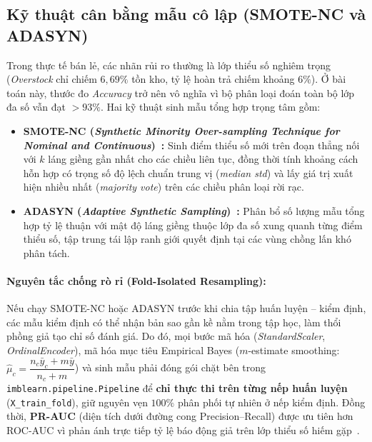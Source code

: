 \subsection{Kỹ thuật cân bằng mẫu cô lập (SMOTE-NC và ADASYN)}
Trong thực tế bán lẻ, các nhãn rủi ro thường là lớp thiểu số nghiêm trọng (\textit{Overstock} chỉ chiếm $6{,}69\%$ tồn kho, tỷ lệ hoàn trả chiếm khoảng $6\%$). Ở bài toán này, thước đo \textit{Accuracy} trở nên vô nghĩa vì bộ phân loại đoán toàn bộ lớp đa số vẫn đạt $> 93\%$. Hai kỹ thuật sinh mẫu tổng hợp trọng tâm gồm:
\begin{itemize}[topsep=0pt, itemsep=1pt]
	\item \textbf{SMOTE-NC (\textit{Synthetic Minority Over-sampling Technique for Nominal and Continuous})~\cite{chawla2002smote}:} Sinh điểm thiểu số mới trên đoạn thẳng nối với $k$ láng giềng gần nhất cho các chiều liên tục, đồng thời tính khoảng cách hỗn hợp có trọng số độ lệch chuẩn trung vị (\textit{median std}) và lấy giá trị xuất hiện nhiều nhất (\textit{majority vote}) trên các chiều phân loại rời rạc.
	\item \textbf{ADASYN (\textit{Adaptive Synthetic Sampling})~\cite{he2008adasyn}:} Phân bổ số lượng mẫu tổng hợp tỷ lệ thuận với mật độ láng giềng thuộc lớp đa số xung quanh từng điểm thiểu số, tập trung tái lập ranh giới quyết định tại các vùng chồng lấn khó phân tách.
\end{itemize}

\paragraph{Nguyên tắc chống rò rỉ (Fold-Isolated Resampling):} Nếu chạy SMOTE-NC hoặc ADASYN trước khi chia tập huấn luyện -- kiểm định, các mẫu kiểm định có thể nhận bản sao gần kề nằm trong tập học, làm thổi phồng giả tạo chỉ số đánh giá. Do đó, mọi bước mã hóa (\textit{StandardScaler}, \textit{OrdinalEncoder}), mã hóa mục tiêu Empirical Bayes ($m$-estimate smoothing: $\hat{\mu}_c = \dfrac{n_c \bar{y}_c + m \bar{y}}{n_c + m}$) và sinh mẫu phải đóng gói chặt bên trong \texttt{imblearn.pipeline.Pipeline} để \textbf{chỉ thực thi trên từng nếp huấn luyện} (\texttt{X\_train\_fold}), giữ nguyên vẹn $100\%$ phân phối tự nhiên ở nếp kiểm định. Đồng thời, \textbf{PR-AUC} (diện tích dưới đường cong Precision--Recall) được ưu tiên hơn ROC-AUC vì phản ánh trực tiếp tỷ lệ báo động giả trên lớp thiểu số hiếm gặp~\cite{saito2015prauc}.

